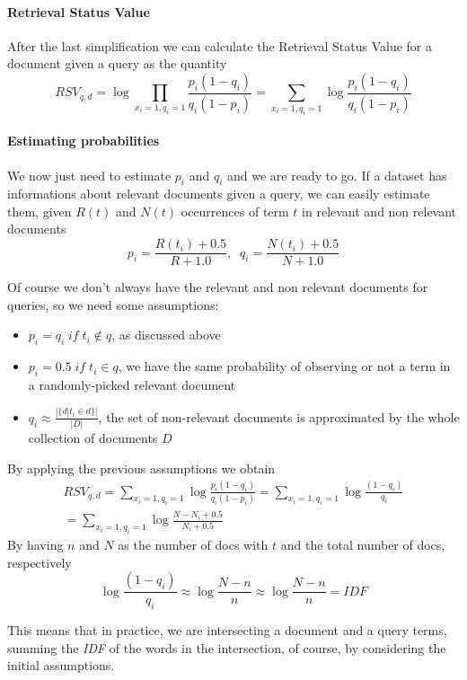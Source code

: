 \paragraph{Retrieval Status Value}
After the last simplification we can calculate the Retrieval Status Value
for a document given a query as the quantity
$$\mathit{RSV}_{q,d} = \log \prod_{x_i=1, q_i = 1} 
\frac{p_i(1-q_i)}{q_i(1-p_i)} = \sum_{x_i=1, q_i = 1} \log 
\frac{p_i(1-q_i)}{q_i(1-p_i)}$$

\paragraph{Estimating probabilities}
We now just need to estimate $p_i$ and $q_i$ and we are ready to go.
If a dataset has informations about relevant documents given a query, 
we can easily estimate them, given $R(t)$ and $N(t)$ occurrences of term $t$ in 
relevant and non relevant documents
$$p_i = \frac{R(t_i) + 0.5}{R + 1.0}, \;\; q_i = \frac{N(t_i) + 0.5}{N + 1.0}$$

Of course we don't always have the relevant and non relevant documents 
for queries, so we need some assumptions:
\begin{itemize}
    \item $p_i = q_i\;\mathit{if}\; t_i \notin q$, as discussed above
    \item $p_i = 0.5\;\mathit{if}\; t_i \in q$, we have the same probability of 
    observing or not a term in a randomly-picked relevant document
    \item $q_i \approx \frac{ |\{ d | t_i \in d\}| }{ |D| }$, 
    the set of non-relevant documents is approximated by the whole collection 
    of documents $D$
\end{itemize}
By applying the previous assumptions we obtain
\begin{equation}
    \begin{aligned}
        \mathit{RSV}_{q,d} = \sum_{x_i=1, q_i = 1} \log \frac{p_i(1-q_i)}{q_i(1-p_i)}
        = \sum_{x_i=1, q_i = 1} \log \frac{(1-q_i)}{q_i}\\
        = \sum_{x_i=1, q_i = 1} \log \frac{N - N_i + 0.5}{N_i + 0.5}
    \end{aligned}
\end{equation}
By having $n$ and $N$ as the number of docs with $t$ and the total 
number of docs, respectively
$$\log \frac{(1-q_i)}{q_i} \approx \log \frac{N-n}{n} \approx \log \frac{N-n}{n} = \mathit{IDF}$$

This means that in practice, we are intersecting a document and a query terms, 
summing the \emph{IDF} of the words in the intersection, of course, by
considering the initial assumptions.


